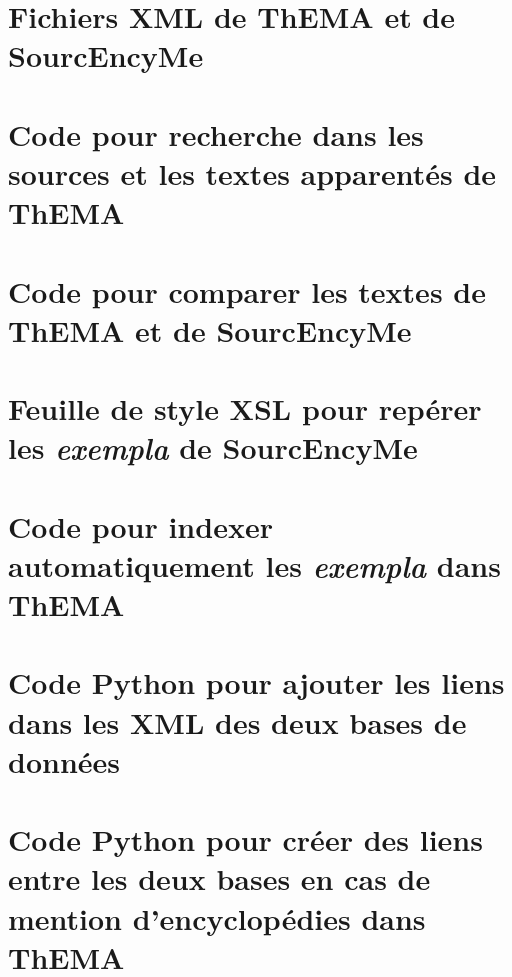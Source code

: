 \documentclass[a4paper,12pt,twoside]{book} %
\begin{document}
\chapter[Fichiers XML de ThEMA et de SourcEncyMe]{Fichiers XML de ThEMA et de SourcEncyMe}

\pagestyle{empty}

\chapter[Code pour recherche dans les sources et les textes apparentés de ThEMA]{Code pour recherche dans les sources et les textes apparentés de ThEMA}

\pagestyle{empty}

\chapter[Code pour comparer les textes de ThEMA et de SourcEncyMe]{Code pour comparer les textes de ThEMA et de SourcEncyMe}

\pagestyle{empty}

\chapter[Feuille de style \index{XSL}XSL pour repérer les \textit{exempla} de SourcEncyMe]{Feuille de style XSL pour repérer les \textit{exempla} de SourcEncyMe}

\pagestyle{empty}

\chapter[Code pour indexer automatiquement les \textit{exempla} dans ThEMA]{Code pour indexer automatiquement les \textit{exempla} dans ThEMA}

\pagestyle{empty}

\chapter[Code Python pour ajouter les liens dans les XML des deux bases de données]{Code Python pour ajouter les liens dans les XML des deux bases de données}

\pagestyle{empty}

\chapter[Code Python pour créer des liens entre les deux bases en cas de mention d'encyclopédies dans ThEMA]{Code Python pour créer des liens entre les deux bases en cas de mention d'encyclopédies dans ThEMA}

\pagestyle{empty}

\newpage{\pagestyle{empty}\cleardoublepage}


\backmatter %

\printindex
\pagestyle{empty}
\tableofcontents
\end{document}
